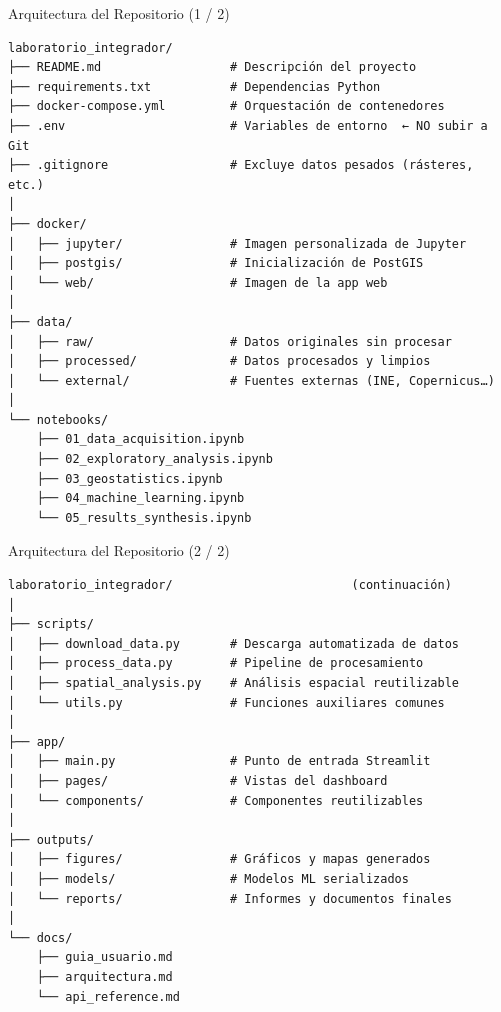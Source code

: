 \documentclass[aspectratio=169]{beamer}
\begin{document}
\begin{frame}[fragile]{Arquitectura del Repositorio (1 / 2)}
\footnotesize
\begin{verbatim}
laboratorio_integrador/
├── README.md                  # Descripción del proyecto
├── requirements.txt           # Dependencias Python
├── docker-compose.yml         # Orquestación de contenedores
├── .env                       # Variables de entorno  ← NO subir a Git
├── .gitignore                 # Excluye datos pesados (rásteres, etc.)
│
├── docker/
│   ├── jupyter/               # Imagen personalizada de Jupyter
│   ├── postgis/               # Inicialización de PostGIS
│   └── web/                   # Imagen de la app web
│
├── data/
│   ├── raw/                   # Datos originales sin procesar
│   ├── processed/             # Datos procesados y limpios
│   └── external/              # Fuentes externas (INE, Copernicus…)
│
└── notebooks/
    ├── 01_data_acquisition.ipynb
    ├── 02_exploratory_analysis.ipynb
    ├── 03_geostatistics.ipynb
    ├── 04_machine_learning.ipynb
    └── 05_results_synthesis.ipynb
\end{verbatim}
\end{frame}

\begin{frame}[fragile]{Arquitectura del Repositorio (2 / 2)}
\footnotesize
\begin{verbatim}
laboratorio_integrador/                         (continuación)
│
├── scripts/
│   ├── download_data.py       # Descarga automatizada de datos
│   ├── process_data.py        # Pipeline de procesamiento
│   ├── spatial_analysis.py    # Análisis espacial reutilizable
│   └── utils.py               # Funciones auxiliares comunes
│
├── app/
│   ├── main.py                # Punto de entrada Streamlit
│   ├── pages/                 # Vistas del dashboard
│   └── components/            # Componentes reutilizables
│
├── outputs/
│   ├── figures/               # Gráficos y mapas generados
│   ├── models/                # Modelos ML serializados
│   └── reports/               # Informes y documentos finales
│
└── docs/
    ├── guia_usuario.md
    ├── arquitectura.md
    └── api_reference.md
\end{verbatim}
\end{frame}
\end{document}
